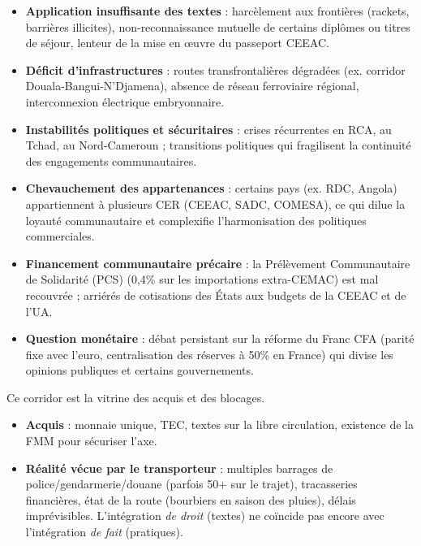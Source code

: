 \documentclass[11pt]{article}
\newcommand{\cle}[1]{{\popxbold\color{popdark}#1}}
\begin{document}
\begin{attention}
\begin{itemize}
\item \textbf{Application insuffisante des textes} : harcèlement aux frontières (rackets, barrières illicites), non-reconnaissance mutuelle de certains diplômes ou titres de séjour, lenteur de la mise en œuvre du passeport CEEAC.
\item \textbf{Déficit d'infrastructures} : routes transfrontalières dégradées (ex. corridor Douala-Bangui-N'Djamena), absence de réseau ferroviaire régional, interconnexion électrique embryonnaire.
\item \textbf{Instabilités politiques et sécuritaires} : crises récurrentes en RCA, au Tchad, au Nord-Cameroun ; transitions politiques qui fragilisent la continuité des engagements communautaires.
\item \textbf{Chevauchement des appartenances} : certains pays (ex. RDC, Angola) appartiennent à plusieurs CER (CEEAC, SADC, COMESA), ce qui dilue la loyauté communautaire et complexifie l'harmonisation des politiques commerciales.
\item \textbf{Financement communautaire précaire} : la \cle{Prélèvement Communautaire de Solidarité (PCS)} (0,4\% sur les importations extra-CEMAC) est mal recouvrée ; arriérés de cotisations des États aux budgets de la CEEAC et de l'UA.
\item \textbf{Question monétaire} : débat persistant sur la réforme du Franc CFA (parité fixe avec l'euro, centralisation des réserves à 50\% en France) qui divise les opinions publiques et certains gouvernements.
\end{itemize}
\end{attention}

\begin{exemplebox}
Ce corridor est la vitrine des acquis et des blocages.
\begin{itemize}
\item \textbf{Acquis} : monnaie unique, TEC, textes sur la libre circulation, existence de la FMM pour sécuriser l'axe.
\item \textbf{Réalité vécue par le transporteur} : multiples barrages de police/gendarmerie/douane (parfois 50+ sur le trajet), tracasseries financières, état de la route (bourbiers en saison des pluies), délais imprévisibles. L'intégration \emph{de droit} (textes) ne coïncide pas encore avec l'intégration \emph{de fait} (pratiques).
\end{itemize}
\end{exemplebox}
\end{document}
